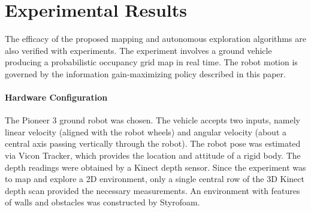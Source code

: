 \documentclass[smallextended]{svjour3}       %
\newcommand{\refeqn}[1]{(\ref{eqn:#1})}
\begin{document}
%
%


\section{Experimental Results}
\label{sec:ExpRes}




The efficacy of the proposed mapping and autonomous exploration algorithms are also verified with experiments. The experiment involves a ground vehicle producing a probabilistic occupancy grid map in real time. The robot motion is governed by the information gain-maximizing policy described in this paper.

\paragraph{Hardware Configuration}
The Pioneer 3 ground robot was chosen. The vehicle accepts two inputs, namely linear velocity (aligned with the robot wheels) and angular velocity (about a central axis passing vertically through the robot). The robot pose was estimated via Vicon Tracker, which provides the location and attitude of a rigid body. The depth readings were obtained by a Kinect depth sensor. Since the experiment was to map and explore a 2D environment, only a single central row of the 3D Kinect depth scan provided the necessary measurements.
An environment with features of walls and obstacles was constructed by Styrofoam.
\end{document}
